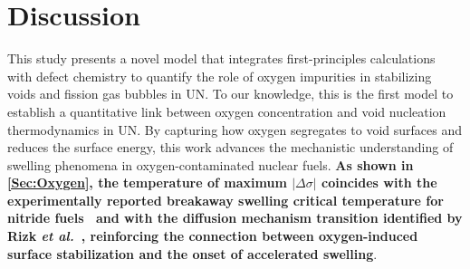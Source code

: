 \documentclass[preprint,12pt,sort&compress]{elsarticle}
\newcommand{\?}{\stackrel{?}{=}}
\providecommand{\DIFaddtex}[1]{{\bf #1}} %
\providecommand{\DIFdeltex}[1]{} %
\providecommand{\DIFaddbegin}{\protect\color{blue}} %
\providecommand{\DIFaddend}{\protect\color{black}} %
\providecommand{\DIFdelbegin}{\protect\color{red}} %
\providecommand{\DIFdelend}{\protect\color{black}} %
\providecommand{\DIFadd}[1]{\texorpdfstring{\DIFaddtex{#1}}{#1}} %
\providecommand{\DIFdel}[1]{\texorpdfstring{\DIFdeltex{#1}}{}} %
\newcommand{\DIFscaledelfig}{0.5}
\newlength{\DIFdelgraphicswidth} %
\newlength{\DIFdelgraphicsheight} %
\newcommand{\DIFaddincludegraphics}[2][]{{\color{blue}\fbox{\DIFOincludegraphics[#1]{#2}}}} %
\newcommand{\DIFdelincludegraphics}[2][]{%
\sbox{\DIFdelgraphicsbox}{\DIFOincludegraphics[#1]{#2}}%
\settoboxwidth{\DIFdelgraphicswidth}{\DIFdelgraphicsbox} %
\settoboxtotalheight{\DIFdelgraphicsheight}{\DIFdelgraphicsbox} %
\scalebox{\DIFscaledelfig}{%
\parbox[b]{\DIFdelgraphicswidth}{\usebox{\DIFdelgraphicsbox}\\[-\baselineskip] \rule{\DIFdelgraphicswidth}{0em}}\llap{\resizebox{\DIFdelgraphicswidth}{\DIFdelgraphicsheight}{%
\setlength{\unitlength}{\DIFdelgraphicswidth}%
\begin{picture}(1,1)%
\thicklines\linethickness{2pt} %
{\color[rgb]{1,0,0}\put(0,0){\framebox(1,1){}}}%
{\color[rgb]{1,0,0}\put(0,0){\line( 1,1){1}}}%
{\color[rgb]{1,0,0}\put(0,1){\line(1,-1){1}}}%
\end{picture}%
}\hspace*{3pt}}} %
} %
\DeclareRobustCommand{\DIFaddbegin}{\DIFOaddbegin \let\includegraphics\DIFaddincludegraphics} %
\DeclareRobustCommand{\DIFaddend}{\DIFOaddend \let\includegraphics\DIFOincludegraphics} %
\DeclareRobustCommand{\DIFdelbegin}{\DIFOdelbegin \let\includegraphics\DIFdelincludegraphics} %
\DeclareRobustCommand{\DIFdelend}{\DIFOaddend \let\includegraphics\DIFOincludegraphics} %
\begin{document}
\section{Discussion}
\DIFaddbegin \label{Sec:Discuss}
\DIFaddend 

This study presents a novel model that integrates first-principles calculations with defect chemistry to quantify the role of oxygen impurities in stabilizing voids and fission gas bubbles in UN. To our knowledge, this is the first model to establish a quantitative link between oxygen concentration and void nucleation thermodynamics in UN. By capturing how oxygen segregates to void surfaces and reduces the surface energy, this work advances the mechanistic understanding of swelling phenomena in oxygen-contaminated nuclear fuels. \DIFdelbegin \DIFdel{Importantly, this surface energy reduction is found to be most pronounced for void embryos ($R_v$ = 1 nm) at intermediate temperatures (1300--1700~K), aligning with the temperature range associated with the onset of breakaway swelling in UN \cite{Ronchi1975,Ronchi1978,Rizk2025}. Noting that the range of operating temperatures in liquid metal-cooled fast reactors is 800--2000 K \cite{Turos1990}, these findings highlight oxygen adsorption as a critical factor in facilitating void nucleation under conditions typical of reactor environments}\DIFdelend \DIFaddbegin \DIFadd{As shown in \cref{Sec:Oxygen}, the temperature of maximum $|\Delta \sigma|$ coincides with the experimentally reported breakaway swelling critical temperature for nitride fuels~\cite{Ronchi1978} and with the diffusion mechanism transition identified by Rizk \textit{et al.}~\cite{Rizk2025}, reinforcing the connection between oxygen-induced surface stabilization and the onset of accelerated swelling}\DIFaddend .

\DIFaddbegin 
\end{document}
